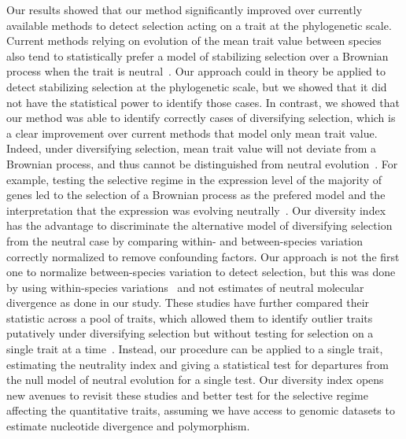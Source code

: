 \documentclass{article}
\begin{document}
Our results showed that our method significantly improved over currently available methods to detect selection acting on a trait at the phylogenetic scale.
Current methods relying on evolution of the mean trait value between species also tend to statistically prefer a model of stabilizing selection over a Brownian process when the trait is neutral~\parencite{silvestro_measurement_2015, cooper_cautionary_2016, price_detecting_2022}.
Our approach could in theory be applied to detect stabilizing selection at the phylogenetic scale, but we showed that it did not have the statistical power to identify those cases.
In contrast, we showed that our method was able to identify correctly cases of diversifying selection, which is a clear improvement over current methods that model only mean trait value.
Indeed, under diversifying selection, mean trait value will not deviate from a Brownian process, and thus cannot be distinguished from neutral evolution~\parencite{hansen_translating_1996, harmon_phylogenetic_2018}.
For example, testing the selective regime in the expression level of the majority of genes led to the selection of a Brownian process as the prefered model and the interpretation that the expression was evolving neutrally~\parencite{catalan_drift_2019}.
Our diversity index has the advantage to discriminate the alternative model of diversifying selection from the neutral case by comparing within- and between-species variation correctly normalized to remove confounding factors.
Our approach is not the first one to normalize between-species variation to detect selection, but this was done by using within-species variations~\parencite{rohlfs_modeling_2014, rohlfs_phylogenetic_2015} and not estimates of neutral molecular divergence as done in our study.
These studies have further compared their statistic across a pool of traits, which allowed them to identify outlier traits putatively under diversifying selection but without testing for selection on a single trait at a time~\parencite{rohlfs_phylogenetic_2015, gillard_comparative_2021}.
Instead, our procedure can be applied to a single trait, estimating the neutrality index and giving a statistical test for departures from the null model of neutral evolution for a single test.
Our diversity index opens new avenues to revisit these studies and better test for the selective regime affecting the quantitative traits, assuming we have access to genomic datasets to estimate nucleotide divergence and polymorphism.
\end{document}
